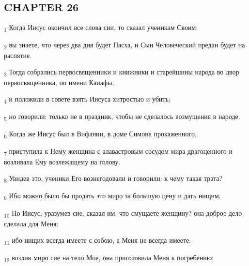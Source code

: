 \subsection{CHAPTER 26}
\begin{tcolorbox}
\textsubscript{1} Когда Иисус окончил все слова сии, то сказал ученикам Своим:
\end{tcolorbox}
\begin{tcolorbox}
\textsubscript{2} вы знаете, что через два дня будет Пасха, и Сын Человеческий предан будет на распятие.
\end{tcolorbox}
\begin{tcolorbox}
\textsubscript{3} Тогда собрались первосвященники и книжники и старейшины народа во двор первосвященника, по имени Каиафы,
\end{tcolorbox}
\begin{tcolorbox}
\textsubscript{4} и положили в совете взять Иисуса хитростью и убить;
\end{tcolorbox}
\begin{tcolorbox}
\textsubscript{5} но говорили: только не в праздник, чтобы не сделалось возмущения в народе.
\end{tcolorbox}
\begin{tcolorbox}
\textsubscript{6} Когда же Иисус был в Вифании, в доме Симона прокаженного,
\end{tcolorbox}
\begin{tcolorbox}
\textsubscript{7} приступила к Нему женщина с алавастровым сосудом мира драгоценного и возливала Ему возлежащему на голову.
\end{tcolorbox}
\begin{tcolorbox}
\textsubscript{8} Увидев это, ученики Его вознегодовали и говорили: к чему такая трата?
\end{tcolorbox}
\begin{tcolorbox}
\textsubscript{9} Ибо можно было бы продать это миро за большую цену и дать нищим.
\end{tcolorbox}
\begin{tcolorbox}
\textsubscript{10} Но Иисус, уразумев сие, сказал им: что смущаете женщину? она доброе дело сделала для Меня:
\end{tcolorbox}
\begin{tcolorbox}
\textsubscript{11} ибо нищих всегда имеете с собою, а Меня не всегда имеете;
\end{tcolorbox}
\begin{tcolorbox}
\textsubscript{12} возлив миро сие на тело Мое, она приготовила Меня к погребению;
\end{tcolorbox}
